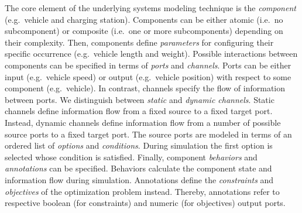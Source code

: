 The core element of the underlying systems modeling technique is the \textit{component} (e.g.\ vehicle and charging station). Components can be either atomic (i.e.\ no subcomponent) or composite (i.e.\ one or more subcomponents) depending on their complexity. Then, components define \textit{parameters} for configuring their specific occurrence (e.g.\ vehicle length and weight). Possible interactions between components can be specified in terms of \textit{ports} and \textit{channels}. Ports can be either input (e.g.\ vehicle speed) or output (e.g.\ vehicle position) with respect to some component (e.g.\ vehicle). In contrast, channels specify the flow of information between ports. We distinguish between \textit{static} and \textit{dynamic channels}. Static channels define information flow from a fixed source to a fixed target port. Instead, dynamic channels define information flow from a number of possible source ports to a fixed target port. The source ports are modeled in terms of an ordered list of \textit{options} and \textit{conditions}. During simulation the first option is selected whose condition is satisfied. Finally, component \textit{behaviors} and \textit{annotations} can be specified. Behaviors calculate the component state and information flow during simulation. Annotations define the \textit{constraints} and \textit{objectives} of the optimization problem instead. Thereby, annotations refer to respective boolean (for constraints) and numeric (for objectives) output ports.

